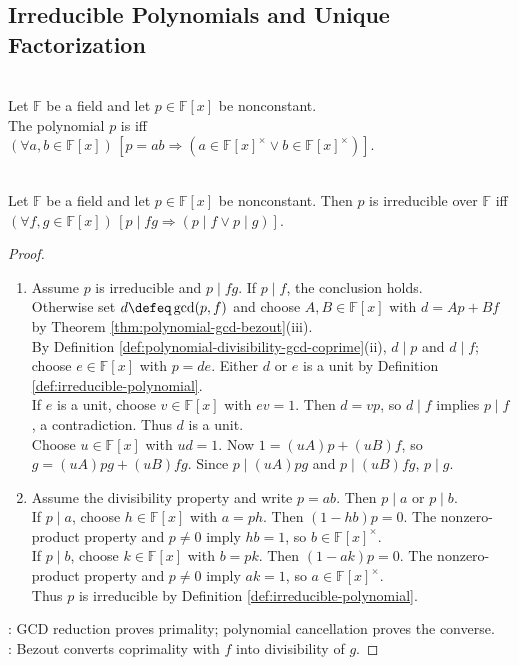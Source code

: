 \subsection{Irreducible Polynomials and Unique Factorization}

\begin{definition} \label{def:irreducible-polynomial} \\
Let $\mathbb{F}$ be a field and let $p\in\mathbb{F}[x]$ be nonconstant.\\
The polynomial $p$ is  iff $(\forall a,b\in\mathbb{F}[x])\,[p=ab\Rightarrow(a\in\mathbb{F}[x]^\times\lor b\in\mathbb{F}[x]^\times)]$.
\end{definition}

\begin{proposition} \label{prop:irreducible-polynomial-prime-property} \\
Let $\mathbb{F}$ be a field and let $p\in\mathbb{F}[x]$ be nonconstant. Then $p$ is irreducible over $\mathbb{F}$ iff $(\forall f,g\in\mathbb{F}[x])\,[p\mid fg\Rightarrow(p\mid f\lor p\mid g)]$.
\begin{proof}
\begin{enumerate}[label=\roman*.]
\setlength{\itemsep}{0pt}
\item[$(\Rightarrow)$] Assume $p$ is irreducible and $p\mid fg$. If $p\mid f$, the conclusion holds.\\
Otherwise set $d\defeq\gcd(p,f)$ and choose $A,B\in\mathbb{F}[x]$ with $d=Ap+Bf$ by Theorem \ref{thm:polynomial-gcd-bezout}(iii).\\
By Definition \ref{def:polynomial-divisibility-gcd-coprime}(ii), $d\mid p$ and $d\mid f$; choose $e\in\mathbb{F}[x]$ with $p=de$. Either $d$ or $e$ is a unit by Definition \ref{def:irreducible-polynomial}.\\
If $e$ is a unit, choose $v\in\mathbb{F}[x]$ with $ev=1$. Then $d=vp$, so $d\mid f$ implies $p\mid f$, a contradiction. Thus $d$ is a unit.\\
Choose $u\in\mathbb{F}[x]$ with $ud=1$. Now $1=(uA)p+(uB)f$, so $g=(uA)pg+(uB)fg$. Since $p\mid(uA)pg$ and $p\mid(uB)fg$, $p\mid g$.
\item[$(\Leftarrow)$] Assume the divisibility property and write $p=ab$. Then $p\mid a$ or $p\mid b$.\\
If $p\mid a$, choose $h\in\mathbb{F}[x]$ with $a=ph$. Then $(1-hb)p=0$. The nonzero-product property and $p\neq0$ imply $hb=1$, so $b\in\mathbb{F}[x]^\times$.\\
If $p\mid b$, choose $k\in\mathbb{F}[x]$ with $b=pk$. Then $(1-ak)p=0$. The nonzero-product property and $p\neq0$ imply $ak=1$, so $a\in\mathbb{F}[x]^\times$.\\
Thus $p$ is irreducible by Definition \ref{def:irreducible-polynomial}.
\end{enumerate}
: GCD reduction proves primality; polynomial cancellation proves the converse.\\
: Bezout converts coprimality with $f$ into divisibility of $g$.
\end{proof}
\end{proposition}

